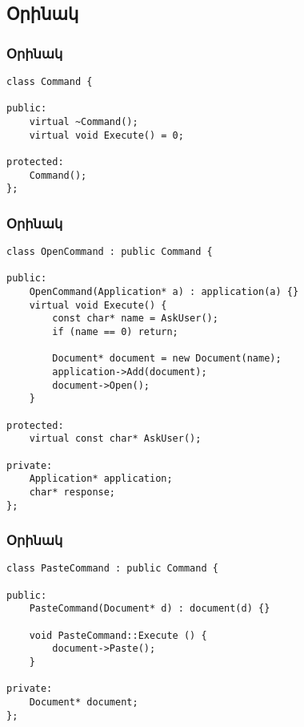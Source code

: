 \documentclass{beamer}
\begin{document}
\subsection{Օրինակ}
\begin{frame}[fragile]\frametitle{Օրինակ}
\begin{english}
\begin{verbatim}
class Command {

public:
    virtual ~Command();
    virtual void Execute() = 0;

protected:
    Command();
};
\end{verbatim}
\end{english}
\end{frame}

\begin{frame}[fragile]\frametitle{Օրինակ}
\begin{english}
\begin{verbatim}
class OpenCommand : public Command {

public:
    OpenCommand(Application* a) : application(a) {}
    virtual void Execute() {
        const char* name = AskUser();
        if (name == 0) return;

        Document* document = new Document(name);
        application->Add(document);
        document->Open();
    }

protected:
    virtual const char* AskUser();

private:
    Application* application;
    char* response;
};
\end{verbatim}
\end{english}
\end{frame}

\begin{frame}[fragile]\frametitle{Օրինակ}
\begin{english}
\begin{verbatim}
class PasteCommand : public Command {

public:
    PasteCommand(Document* d) : document(d) {}

    void PasteCommand::Execute () {
        document->Paste();
    }

private:
    Document* document;
};
\end{verbatim}
\end{english}
\end{frame}
\end{document}
